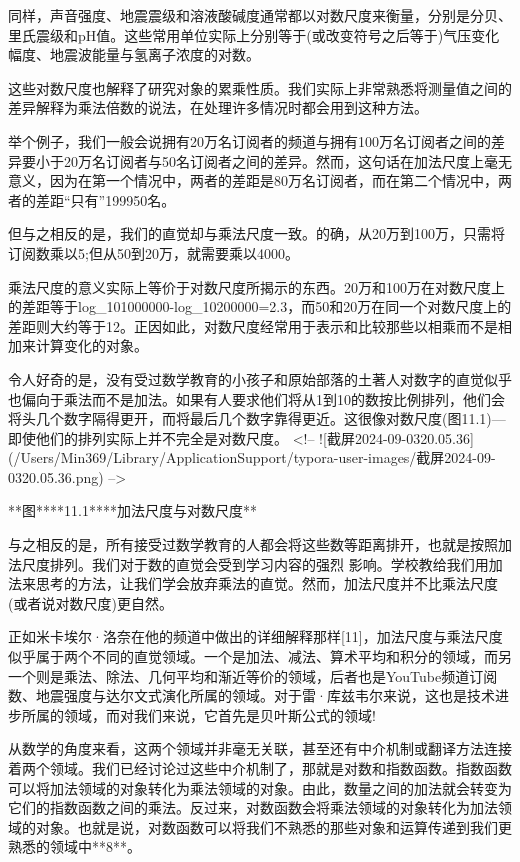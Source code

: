 同样，声音强度、地震震级和溶液酸碱度通常都以对数尺度来衡量，分别是分贝、里氏震级和pH值。这些常用单位实际上分别等于(或改变符号之后等于)气压变化幅度、地震波能量与氢离子浓度的对数。

这些对数尺度也解释了研究对象的累乘性质。我们实际上非常熟悉将测量值之间的差异解释为乘法倍数的说法，在处理许多情况时都会用到这种方法。

举个例子，我们一般会说拥有20万名订阅者的频道与拥有100万名订阅者之间的差异要小于20万名订阅者与50名订阅者之间的差异。然而，这句话在加法尺度上毫无意义，因为在第一个情况中，两者的差距是80万名订阅者，而在第二个情况中，两者的差距“只有”199950名。

但与之相反的是，我们的直觉却与乘法尺度一致。的确，从20万到100万，只需将订阅数乘以5;但从50到20万，就需要乘以4000。

乘法尺度的意义实际上等价于对数尺度所揭示的东西。20万和100万在对数尺度上的差距等于log_101000000-log_10200000=2.3，而50和20万在同一个对数尺度上的差距则大约等于12。正因如此，对数尺度经常用于表示和比较那些以相乘而不是相加来计算变化的对象。

令人好奇的是，没有受过数学教育的小孩子和原始部落的土著人对数字的直觉似乎也偏向于乘法而不是加法。如果有人要求他们将从1到10的数按比例排列，他们会将头几个数字隔得更开，而将最后几个数字靠得更近。这很像对数尺度(图11.1)---即使他们的排列实际上并不完全是对数尺度。
<!-- ![截屏2024-09-0320.05.36](/Users/Min369/Library/ApplicationSupport/typora-user-images/截屏2024-09-0320.05.36.png) -->

**图****11.1****加法尺度与对数尺度**



与之相反的是，所有接受过数学教育的人都会将这些数等距离排开，也就是按照加法尺度排列。我们对于数的直觉会受到学习内容的强烈
影响。学校教给我们用加法来思考的方法，让我们学会放弃乘法的直觉。然而，加法尺度并不比乘法尺度(或者说对数尺度)更自然。

正如米卡埃尔·洛奈在他的频道中做出的详细解释那样[11]，加法尺度与乘法尺度似乎属于两个不同的直觉领域。一个是加法、减法、算术平均和积分的领域，而另一个则是乘法、除法、几何平均和渐近等价的领域，后者也是YouTube频道订阅数、地震强度与达尔文式演化所属的领域。对于雷·库兹韦尔来说，这也是技术进步所属的领域，而对我们来说，它首先是贝叶斯公式的领域!

从数学的角度来看，这两个领域并非毫无关联，甚至还有中介机制或翻译方法连接着两个领域。我们已经讨论过这些中介机制了，那就是对数和指数函数。指数函数可以将加法领域的对象转化为乘法领域的对象。由此，数量之间的加法就会转变为它们的指数函数之间的乘法。反过来，对数函数会将乘法领域的对象转化为加法领域的对象。也就是说，对数函数可以将我们不熟悉的那些对象和运算传递到我们更熟悉的领域中**8**。



